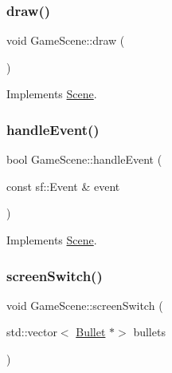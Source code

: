 \subsubsection{\texorpdfstring{draw()}{draw()}}
{\footnotesize\ttfamily void Game\+Scene\+::draw (\begin{DoxyParamCaption}{ }\end{DoxyParamCaption})\hspace{0.3cm}{\ttfamily [virtual]}}



Implements \hyperlink{class_scene_a789c16961aa1e316b2a4a05b95187546}{Scene}.

\mbox{\label{class_game_scene_aa494372b1f451f3c3a268558fddb30f2}} 
\subsubsection{\texorpdfstring{handle\+Event()}{handleEvent()}}
{\footnotesize\ttfamily bool Game\+Scene\+::handle\+Event (\begin{DoxyParamCaption}\item[{const sf\+::\+Event \&}]{event }\end{DoxyParamCaption})\hspace{0.3cm}{\ttfamily [virtual]}}



Implements \hyperlink{class_scene_af25e4d2c998aca4e95899fb67488e815}{Scene}.

\mbox{\label{class_game_scene_a030583d6469d9f44fda3fc5777c46a08}} 
\subsubsection{\texorpdfstring{screen\+Switch()}{screenSwitch()}}
{\footnotesize\ttfamily void Game\+Scene\+::screen\+Switch (\begin{DoxyParamCaption}\item[{std\+::vector$<$ \hyperlink{class_bullet}{Bullet} $\ast$$>$}]{bullets }\end{DoxyParamCaption})}

\mbox{\label{class_game_scene_aca0b30f731595929fb7182e2f65941b1}} 
